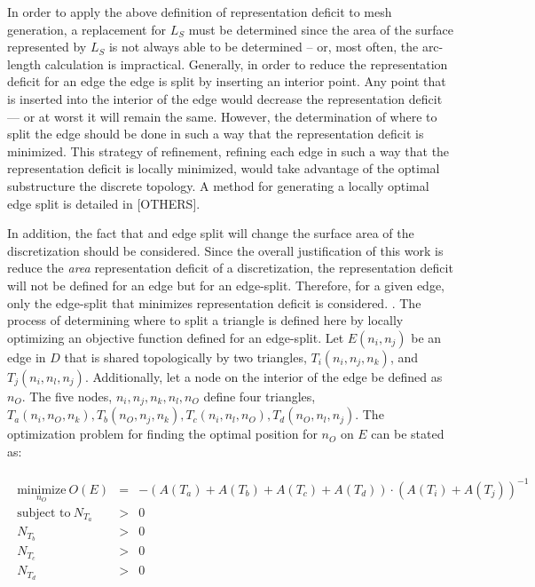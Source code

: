 In order to apply the above definition of representation deficit to mesh
generation, a replacement for $L_S$ must be determined since the area of
the surface represented by $L_S$ is not always able to be determined --
or, most often, the arc-length calculation is impractical.
Generally, in order to reduce the representation deficit for an edge 
the edge is split by inserting an interior point. Any point that is
inserted into the interior of the edge would decrease the
representation deficit --- or at worst it will remain the same. However,
the determination of where to split the edge should be done in such
a way that the representation deficit is minimized. This strategy of
refinement, refining each edge in such a way that the representation
deficit is locally minimized, would take advantage of the optimal
substructure the discrete topology. A method for generating a locally
optimal edge split is detailed in \cite{mclaurin12,mclaurin13}[OTHERS].

In addition, the fact that and edge split will change the surface area
of the discretization should be considered. Since the overall
justification of this work is reduce the {\it area} representation
deficit of a discretization, the representation deficit will not be
defined for an edge but for an edge-split. Therefore, for a given edge,
only the edge-split that minimizes representation deficit is considered.
. The process of determining where to split a triangle is defined here
by locally optimizing an objective function defined for an edge-split.
Let $E\left(n_i,n_j\right)$ be an edge in $D$ that is shared
topologically by two triangles, $T_i\left(n_i,n_j,n_k\right)$, and
$T_j\left(n_i,n_l,n_j\right)$. Additionally, let a node on the interior
of the edge be defined as $n_O$. The five nodes, $n_i,n_j,n_k,n_l,n_O$
define four triangles, $T_a\left(n_i,n_O,n_k\right), T_b\left(n_O,n_j,
n_k\right), T_c\left(n_i,n_l,n_O\right), T_d\left(n_O,n_l,n_j\right)$.
The optimization problem for finding the optimal position for $n_O$ on
$E$ can be stated as:

\begin{eqnarray*}
\begin{array}{rcl}
\underset{n_O}{\text{minimize}} \ O(E) & = & -\left(A\left(T_a\right) + A\left(T_b\right) + A\left(T_c\right) + A\left(T_d\right) \right) \cdot \left(A\left(T_i\right) + A\left(T_j\right) \right)^{-1} \\
\text{subject to} \ N_{T_a} & > & 0 \\
N_{T_b} & > & 0 \\ 
N_{T_c} & > & 0 \\
N_{T_d} & > & 0 \\
\end{array}
\end{eqnarray*}

